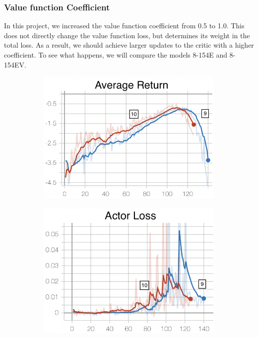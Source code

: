 \subsubsection{Value function Coefficient}
In this project, we increased the value function coefficient from 0.5 to 1.0. This does not directly change the value function loss, but determines its weight in the total loss. As a result, we should achieve larger updates to the critic with a higher coefficient. To see what happens, we will compare the models 8-154E and 8-154EV.
\begin{figure}[hbt]
     \centering
     \begin{subfigure}[b]{0.32\textwidth}
         \centering
         \includegraphics[width=\textwidth]{figures/5_/Training/ppo_vfcoeffAvgReturn.png}
         \caption{}
         \label{fig:5_training_ppo_vfcoeffAvgReturn}
     \end{subfigure} 
     \hfill
     \begin{subfigure}[b]{0.32\textwidth}
         \centering
         \includegraphics[width=\textwidth]{figures/5_/Training/ppo_vfcoeffActorL.png}

\end{subfigure}
\end{figure}
